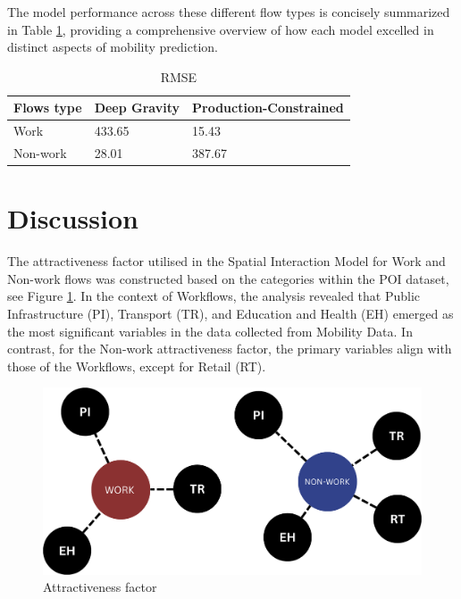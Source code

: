     The model performance across these different flow types is concisely summarized in Table \ref{table: RMSE}, providing a comprehensive overview of how each model excelled in distinct aspects of mobility prediction.

        \begin{table}[h]
        \centering
        \begin{tabular}{@{}lll@{}}
        \toprule
        \textbf{Flows type} & \textbf{Deep Gravity} & \textbf{Production-Constrained} \\ \midrule
        Work                & 433.65                & 15.43                           \\
        Non-work            & 28.01                 & 387.67                          \\ \bottomrule
        \end{tabular}
            \caption{RMSE}
            \label{table: RMSE}
        \end{table}


\section{Discussion}

       The attractiveness factor utilised in the Spatial Interaction Model for Work and Non-work flows was constructed based on the categories within the POI dataset, see Figure \ref{fig: Attractiveness factor}. In the context of Workflows, the analysis revealed that Public Infrastructure (PI), Transport (TR), and Education and Health (EH) emerged as the most significant variables in the data collected from Mobility Data. In contrast, for the Non-work attractiveness factor, the primary variables align with those of the Workflows, except for Retail (RT).

        \begin{figure}[H]
            \centering
            \includegraphics[width=14cm]{Images/Atractiveness factor.png}
            \caption{Attractiveness factor}
            \label{fig: Attractiveness factor}
        \end{figure}

